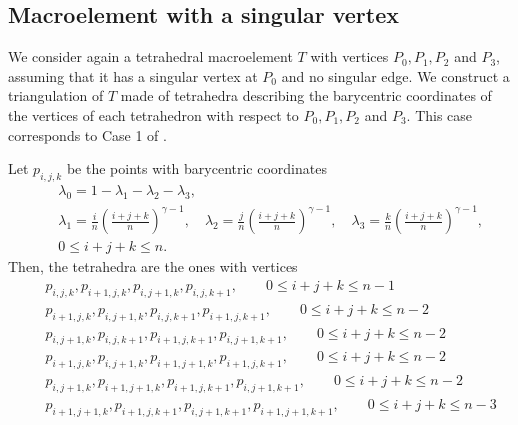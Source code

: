 \subsection{Macroelement with a singular vertex}

We consider again a tetrahedral macroelement $T$ with vertices $P_0, P_1, P_2$ and $P_3$, assuming that it has a singular vertex at $P_0$ and no singular edge. We construct a triangulation of $T$ made of tetrahedra describing the barycentric coordinates of the vertices of each tetrahedron with respect to $P_0, P_1, P_2$ and $P_3$. This case corresponds to Case 1 of \cite{AN}.

Let $p_{i,j,k}$ be the points with barycentric coordinates
\begin{eqnarray*}
&&\lambda_0=1-\lambda_1-\lambda_2-\lambda_3,\\
&&\lambda_1=\frac in\left(\frac{i+j+k}n\right)^{\gamma-1},\quad \lambda_2=\frac jn\left(\frac{i+j+k}n\right)^{\gamma-1},\quad \lambda_3=\frac kn\left(\frac{i+j+k}n\right)^{\gamma-1},
\\ &&0\le i+j+k\le n.
\end{eqnarray*}
Then, the tetrahedra are the ones with vertices
\begin{eqnarray*}
&& p_{i,j,k}, p_{i+1,j,k}, p_{i,j+1,k}, p_{i,j,k+1}, \qquad 0\le i+j+k\le n-1\\
&& p_{i+1,j,k}, p_{i,j+1,k}, p_{i,j,k+1}, p_{i+1,j,k+1}, \qquad 0\le i+j+k\le n-2\\
&& p_{i,j+1,k}, p_{i,j,k+1}, p_{i+1,j,k+1}, p_{i,j+1,k+1}, \qquad 0\le i+j+k\le n-2\\
&& p_{i+1,j,k}, p_{i,j+1,k}, p_{i+1,j+1,k}, p_{i+1,j,k+1}, \qquad 0\le i+j+k\le n-2\\
&& p_{i,j+1,k}, p_{i+1,j+1,k}, p_{i+1,j,k+1}, p_{i,j+1,k+1}, \qquad 0\le i+j+k\le n-2\\
&& p_{i+1,j+1,k}, p_{i+1,j,k+1}, p_{i,j+1,k+1}, p_{i+1,j+1,k+1}, \qquad 0\le i+j+k\le n-3
\end{eqnarray*}


